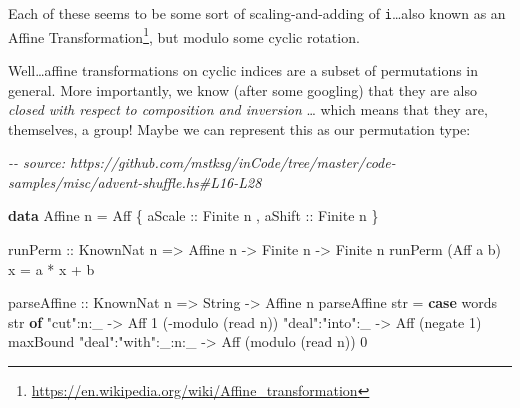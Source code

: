 \documentclass[]{article}
\newenvironment{Shaded}{}{}
\newcommand{\CommentTok}[1]{\textcolor[rgb]{0.38,0.63,0.69}{\textit{#1}}}
\newcommand{\DataTypeTok}[1]{\textcolor[rgb]{0.56,0.13,0.00}{#1}}
\newcommand{\DecValTok}[1]{\textcolor[rgb]{0.25,0.63,0.44}{#1}}
\newcommand{\FunctionTok}[1]{\textcolor[rgb]{0.02,0.16,0.49}{#1}}
\newcommand{\KeywordTok}[1]{\textcolor[rgb]{0.00,0.44,0.13}{\textbf{#1}}}
\newcommand{\NormalTok}[1]{#1}
\newcommand{\OperatorTok}[1]{\textcolor[rgb]{0.40,0.40,0.40}{#1}}
\newcommand{\OtherTok}[1]{\textcolor[rgb]{0.00,0.44,0.13}{#1}}
\newcommand{\StringTok}[1]{\textcolor[rgb]{0.25,0.44,0.63}{#1}}
\renewcommand{\href}[2]{#2\footnote{\url{#1}}}
\begin{document}
Each of these seems to be some sort of scaling-and-adding of
\texttt{i}\ldots also known as an
\href{https://en.wikipedia.org/wiki/Affine_transformation}{Affine
Transformation}, but modulo some cyclic rotation.

Well\ldots affine transformations on cyclic indices are a subset of permutations
in general. More importantly, we know (after some googling) that they are also
\emph{closed with respect to composition and inversion} \ldots{} which means
that they are, themselves, a group! Maybe we can represent this as our
permutation type:

\begin{Shaded}
\begin{Highlighting}[]
\CommentTok{{-}{-} source: https://github.com/mstksg/inCode/tree/master/code{-}samples/misc/advent{-}shuffle.hs\#L16{-}L28}

\KeywordTok{data} \DataTypeTok{Affine}\NormalTok{ n }\OtherTok{=} \DataTypeTok{Aff}
\NormalTok{    \{}\OtherTok{ aScale ::} \DataTypeTok{Finite}\NormalTok{ n}
\NormalTok{    ,}\OtherTok{ aShift ::} \DataTypeTok{Finite}\NormalTok{ n}
\NormalTok{    \}}

\OtherTok{runPerm ::} \DataTypeTok{KnownNat}\NormalTok{ n }\OtherTok{=\textgreater{}} \DataTypeTok{Affine}\NormalTok{ n }\OtherTok{{-}\textgreater{}} \DataTypeTok{Finite}\NormalTok{ n }\OtherTok{{-}\textgreater{}} \DataTypeTok{Finite}\NormalTok{ n}
\NormalTok{runPerm (}\DataTypeTok{Aff}\NormalTok{ a b) x }\OtherTok{=}\NormalTok{ a }\OperatorTok{*}\NormalTok{ x }\OperatorTok{+}\NormalTok{ b}

\OtherTok{parseAffine ::} \DataTypeTok{KnownNat}\NormalTok{ n }\OtherTok{=\textgreater{}} \DataTypeTok{String} \OtherTok{{-}\textgreater{}} \DataTypeTok{Affine}\NormalTok{ n}
\NormalTok{parseAffine str }\OtherTok{=} \KeywordTok{case} \FunctionTok{words}\NormalTok{ str }\KeywordTok{of}
    \StringTok{"cut"}\OperatorTok{:}\NormalTok{n}\OperatorTok{:}\NormalTok{\_           }\OtherTok{{-}\textgreater{}} \DataTypeTok{Aff}                \DecValTok{1}\NormalTok{  (}\OperatorTok{{-}}\NormalTok{modulo (}\FunctionTok{read}\NormalTok{ n))}
    \StringTok{"deal"}\OperatorTok{:}\StringTok{"into"}\OperatorTok{:}\NormalTok{\_     }\OtherTok{{-}\textgreater{}} \DataTypeTok{Aff}\NormalTok{        (}\FunctionTok{negate} \DecValTok{1}\NormalTok{)          }\FunctionTok{maxBound}
    \StringTok{"deal"}\OperatorTok{:}\StringTok{"with"}\OperatorTok{:}\NormalTok{\_}\OperatorTok{:}\NormalTok{n}\OperatorTok{:}\NormalTok{\_ }\OtherTok{{-}\textgreater{}} \DataTypeTok{Aff}\NormalTok{ (modulo (}\FunctionTok{read}\NormalTok{ n))                 }\DecValTok{0}
\end{Highlighting}
\end{Shaded}
\end{document}
